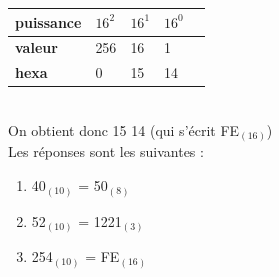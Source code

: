 \begin{Exercice}[15 minutes]
\begin{solution}
   		\begin{tabular}{| C{0.1\textwidth} | C{0.1\textwidth} | C{0.1\textwidth} | C{0.1\textwidth} | C{0.1\textwidth} |} 
            \hline
            \textbf{puissance} & $16^{2}$ & $16^{1}$ & $16^{0}$ \\ [0.5ex] 
            \hline
            \textbf{valeur} & 256 & 16 & 1 \\ [0.5ex] 
            \hline
            \textbf{hexa} & 0 & 15 & 14 \\ [0.5ex] 
            \hline
        \end{tabular} \\
        
        On obtient donc 15 14 (qui s'écrit FE$_{(16)}$)\\
        
        Les réponses sont les suivantes :
        \begin{enumerate}
        \item 40$_{(10)}$ = 50$_{(8)}$
        \item 52$_{(10)}$ = 1221$_{(3)}$
        \item 254$_{(10)}$ = FE$_{(16)}$
        \end{enumerate}
    \end{solution}
\end{Exercice}


